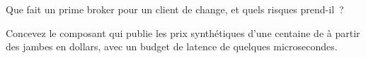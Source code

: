 \begin{interviewq}\label{iq:m2:the-fx-market:5}
Que fait un prime broker pour un client de change, et quels risques prend-il~?
\end{interviewq}

\begin{interviewq}\label{iq:m2:the-fx-market:6}
Concevez le composant qui publie les prix synthétiques d'une centaine de
 à partir des jambes en dollars, avec un budget de latence de quelques microsecondes.
\end{interviewq}
